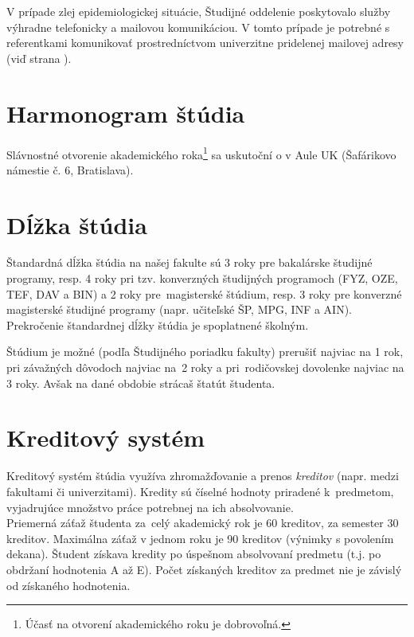 V prípade zlej epidemiologickej situácie, Študijné oddelenie poskytovalo služby výhradne telefonicky a mailovou komunikáciou. V tomto prípade je potrebné s referentkami komunikovať prostredníctvom univerzitne pridelenej mailovej adresy (viď strana \pageref{sec:6.1}). 


\section{Harmonogram štúdia}

Slávnostné otvorenie akademického roka\footnote{Účasť na otvorení akademického roku je dobrovoľná.} {\akademickyRok} sa uskutoční {\otvorenieARd} o {\otvorenieARh} v Aule UK (Šafárikovo námestie č. 6, Bratislava).



\section{Dĺžka štúdia}

Štandardná dĺžka štúdia na našej fakulte sú 3 roky pre bakalárske študijné programy, resp. 4 roky pri tzv. konverzných študijných programoch (FYZ, OZE, TEF, DAV a BIN) a 2 roky pre~magisterské štúdium, resp. 3 roky pre konverzné magisterské študijné programy (napr. učiteľské ŠP, MPG, INF a AIN). Prekročenie štandardnej dĺžky štúdia je spoplatnené školným.

Štúdium je možné (podľa Študijného poriadku fakulty) prerušiť naj\-viac
na 1 rok, pri závažných dôvodoch naj\-viac na~2 roky a pri~rodičovskej
dovolenke najviac na 3 roky. Avšak na dané obdobie strácaš štatút študenta.


\section{Kreditový systém}

Kre\-di\-tový systém štúdia využíva zhromažďovanie a prenos \emph{kre\-di\-tov}
(napr. medzi fakultami či univerzitami). Kredity sú číselné hodnoty
priradené k~predmetom, vyjadrujúce množstvo práce potrebnej na ich
absolvovanie. \\

Priemerná záťaž študenta za~celý akademický rok je 60 kreditov,
za semester 30 kreditov. Maximálna záťaž v jednom roku je 90 kreditov
(výnimky s povolením dekana). Študent získava kredity po úspešnom absolvovaní predmetu (t.j. po obdržaní hodnotenia A až E). Počet získaných kreditov za predmet nie je závislý od získaného hodnotenia. \\

